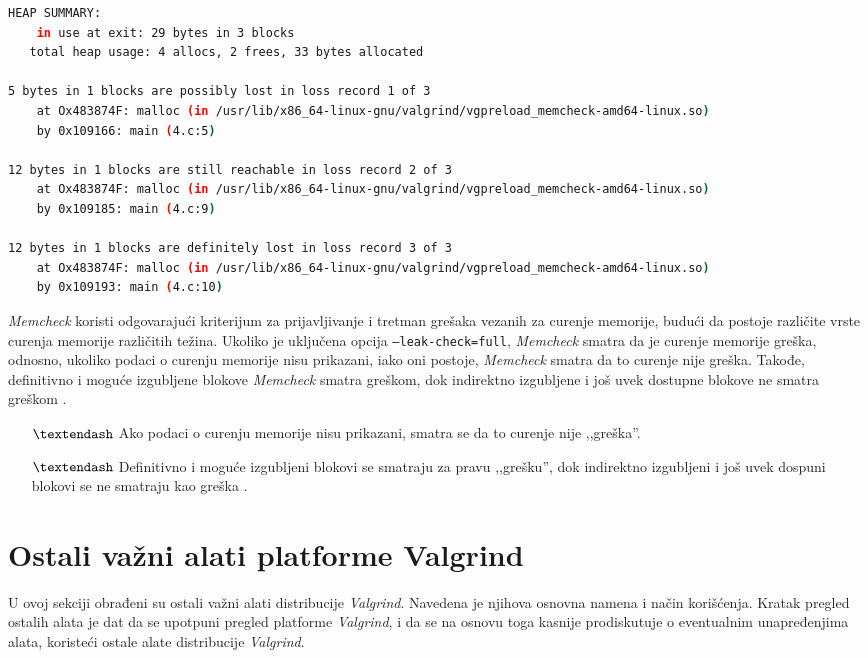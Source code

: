 \documentclass[12pt,oneside]{memoir}
\theoremstyle{plain}
\theoremstyle{definition}
\begin{document}
\begin{lstlisting}[style=terminal,caption={Izveštaj o curenju memorije}, label={lst:slika2.14},language={bash}] 
HEAP SUMMARY:
    in use at exit: 29 bytes in 3 blocks
   total heap usage: 4 allocs, 2 frees, 33 bytes allocated
   
5 bytes in 1 blocks are possibly lost in loss record 1 of 3
    at Ox483874F: malloc (in /usr/lib/x86_64-linux-gnu/valgrind/vgpreload_memcheck-amd64-linux.so)
    by 0x109166: main (4.c:5)

12 bytes in 1 blocks are still reachable in loss record 2 of 3
    at Ox483874F: malloc (in /usr/lib/x86_64-linux-gnu/valgrind/vgpreload_memcheck-amd64-linux.so)
    by 0x109185: main (4.c:9)

12 bytes in 1 blocks are definitely lost in loss record 3 of 3
    at Ox483874F: malloc (in /usr/lib/x86_64-linux-gnu/valgrind/vgpreload_memcheck-amd64-linux.so)
    by 0x109193: main (4.c:10)
\end{lstlisting}

\textit{Memcheck} koristi odgovarajući kriterijum za prijavljivanje i tretman grešaka vezanih za curenje memorije, budući da postoje različite vrste curenja memorije različitih težina. Ukoliko je uključena opcija \texttt{--leak-check=full}, \textit{Memcheck} smatra da je curenje memorije greška, odnosno, ukoliko podaci o curenju memorije nisu prikazani, iako oni postoje, \textit{Memcheck} smatra da to curenje nije greška. Takođe, definitivno i moguće izgubljene blokove \textit{Memcheck} smatra greškom, dok indirektno izgubljene i još uvek dostupne blokove ne smatra greškom \cite{Memcheck}.

\begin{itemize}
\item[$\textendash$] Ako podaci o curenju memorije nisu prikazani, smatra se da to curenje nije ,,greška''.
\item[$\textendash$] Definitivno i moguće izgubljeni blokovi se smatraju za pravu ,,grešku'', dok indirektno izgubljeni i još uvek dospuni blokovi se ne smatraju kao greška \cite{ValgrindDOC}. 
\end{itemize}

\section{Ostali važni alati platforme Valgrind}

U ovoj sekciji obrađeni su ostali važni alati distribucije \textit{Valgrind}. Navedena je njihova osnovna namena i način korišćenja. Kratak pregled ostalih alata je dat da se upotpuni pregled platforme \textit{Valgrind}, i da se na osnovu toga kasnije prodiskutuje o eventualnim unapređenjima alata, koristeći ostale alate distribucije \textit{Valgrind}.
\end{document}
